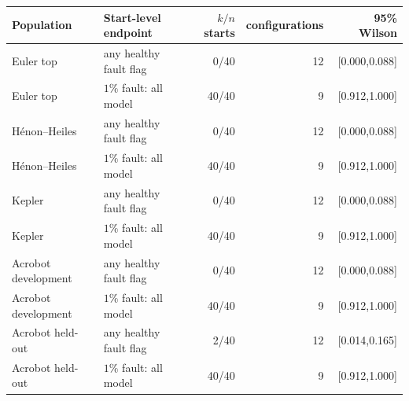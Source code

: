 \begin{tabular}{llrrr}
\toprule
Population & Start-level endpoint & $k/n$ starts & configurations & 95\% Wilson \\
\midrule
Euler top & any healthy fault flag & 0/40 & 12 & [0.000,0.088] \\
Euler top & $1\%$ fault: all model & 40/40 & 9 & [0.912,1.000] \\
H\'enon--Heiles & any healthy fault flag & 0/40 & 12 & [0.000,0.088] \\
H\'enon--Heiles & $1\%$ fault: all model & 40/40 & 9 & [0.912,1.000] \\
Kepler & any healthy fault flag & 0/40 & 12 & [0.000,0.088] \\
Kepler & $1\%$ fault: all model & 40/40 & 9 & [0.912,1.000] \\
Acrobot development & any healthy fault flag & 0/40 & 12 & [0.000,0.088] \\
Acrobot development & $1\%$ fault: all model & 40/40 & 9 & [0.912,1.000] \\
Acrobot held-out & any healthy fault flag & 2/40 & 12 & [0.014,0.165] \\
Acrobot held-out & $1\%$ fault: all model & 40/40 & 9 & [0.912,1.000] \\
\bottomrule
\end{tabular}
